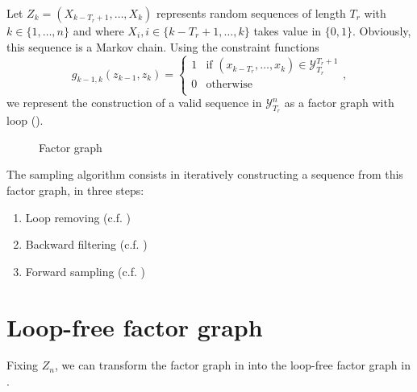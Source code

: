 \documentclass{article}
\begin{document}
    Let $Z_k = (X_{k-T_r+1}, \dots, X_{k})$ represents random sequences of length $T_r$ with $k \in \{1, \dots, n\}$ and where
    $X_i, i \in \{k-T_r + 1, \dots , k\}$ takes value in $\{0,1\}$. 
    Obviously, this sequence is a Markov chain. Using the constraint functions
    \begin{equation}  
      g_{k-1,k}(z_{k-1}, z_{k}) =
      \left\{
        \begin{array}{ll}
          1 & \mbox{if } (x_{k-T_r}, \dots, x_{k}) \in \mathcal{Y}_{T_r}^{T_r + 1}\\
          0 & \mbox{otherwise} \\
        \end{array}
      \right.,
    \end{equation}
    we represent the construction of a valid sequence in $\mathcal{Y}_{T_r}^n$ as a factor graph with loop ().
    \begin{figure}[!ht]
      \centering
      \caption{Factor graph} \label{fig:factor_graph}
    \end{figure}
    The sampling algorithm consists in iteratively constructing a sequence from this factor graph, in three steps:
    \begin{enumerate}
      \item Loop removing (c.f. )
      \item Backward filtering (c.f. )
      \item Forward sampling (c.f. )
    \end{enumerate}
    
    \section{Loop-free factor graph} \label{sec:samplez}
    Fixing $Z_n$, we can transform the factor graph in  into the loop-free 
    factor graph in . 
\end{document}
